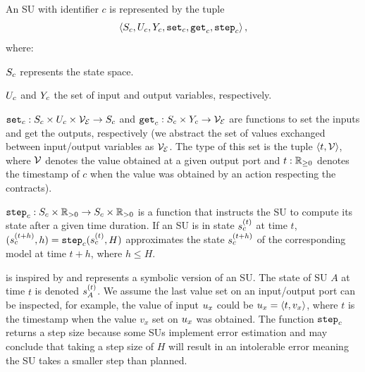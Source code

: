 \begin{definition}\label{def:fmu}
  An SU with identifier $c$ is represented by the tuple
  $$ \left\langle S_{c}, U_{c}, Y_{c}, \mathtt{set}_{c}, \mathtt{get}_{c}, \mathtt{step}_{c} \right\rangle ,$$
  where:
  \begin{compactitem}
    \item $S_{c}$ represents the state space.
    \item $U_{c}$ and $Y_{c}$ the set of input and output variables, respectively. 
    \item $\mathtt{set}_{c} : S_{c} \times U_{c} \times \mathcal{V_{E}} \to S_{c}$ and $\mathtt{get}_{c}: S_{c} \times Y_{c} \to \mathcal{V_{E}}$ are functions to set the inputs and get the outputs, respectively (we abstract the set of values exchanged between input/output variables as $\mathcal{V_{E}}$. The type of this set is the tuple $ \left\langle t, \mathcal{V} \right\rangle $, where $\mathcal{V}$ denotes the value obtained at a given output port and $t: \mathbb{R}_{\geq 0}$ denotes the timestamp of $c$ when the value was obtained by an action respecting the contracts).
    \item $\mathtt{step}_{c}: S_{c} \times \mathbb{R}_{> 0} \to S_{c} \times \mathbb{R}_{> 0} $ is a function that instructs the SU to compute its state after a given time duration. If an SU is in state $s_{c}^{(t)}$ at time $t$, $(s_{c}^{(t+h)}, h) = \mathtt{step}_{c}(s_{c}^{(t)}, H)$ approximates the state $s_{c}^{(t+h)}$ of the corresponding model at time $t+h$, where $h \leq H$. 
  \end{compactitem}
\end{definition}
\vspace{-0.5em}
 is inspired by \cite{Broman2013,Gomes2019c,thrane2021} and represents a symbolic version of an SU. 
The state of SU $A$ at time $t$ is denoted $s_{A}^{(t)}$.
We assume the last value set on an input/output port can be inspected, for example, the value of input $u_{x}$ could be $u_{x} =  \left\langle t, v_x \right\rangle $, where $t$ is the timestamp when the value $v_x$ set on $u_{x}$ was obtained.
The function $\mathtt{step}_{c}$ returns a step size because some SUs implement error estimation and may conclude that taking a step size of $H$ will result in an intolerable error meaning the SU takes a smaller step than planned.

